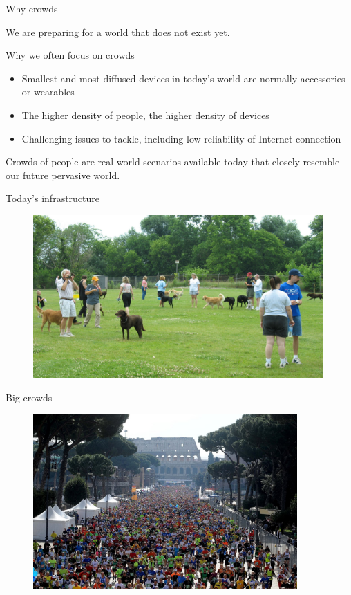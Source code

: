 \documentclass[presentation]{beamer}\mode<presentation>{\usetheme{sapere}}
\begin{document}
\begin{frame}{Why crowds}
  \begin{block}{}
    We are preparing for a world that does not exist yet.
  \end{block}
  \begin{block} {Why we often focus on crowds}
   \begin{itemize}
    \item Smallest and most diffused devices in today's world are normally accessories or wearables
    \item The higher density of people, the higher density of devices
    \item Challenging issues to tackle, including low reliability of Internet connection
   \end{itemize}
  \end{block}
  \begin{block}{}
    Crowds of people are real world scenarios available today that closely resemble our future pervasive world.
  \end{block}
\end{frame}

\begin{frame}{Today's infrastructure}
  \centering
  \scriptsize
  \begin{figure}
    \includegraphics[width=0.99\textwidth]{imgs/random_people} 
  \end{figure}
\end{frame}

\begin{frame}{Big crowds}
  \centering
  \scriptsize
  \begin{figure}
    \includegraphics[width=0.90\textwidth]{imgs/rome_marathon} 
  \end{figure}
\end{frame}
\end{document}
